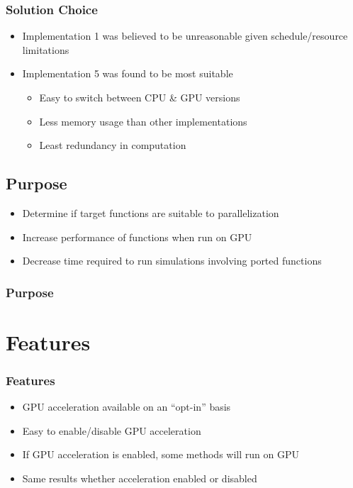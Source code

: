 \documentclass{beamer}
\begin{document}
\begin{frame}
\frametitle{Solution Choice}
\begin{itemize}
\item Implementation 1 was believed to be unreasonable given schedule/resource limitations
\item Implementation 5 was found to be most suitable
\begin{itemize}
\item Easy to switch between CPU & GPU versions
\item Less memory usage than other implementations
\item Least redundancy in computation
\end{itemize}
\end{itemize}
\end{frame}

\subsection{Purpose}
\begin{frame}
\begin{itemize}
\item Determine if target functions are suitable to parallelization 
\item Increase performance of functions when run on GPU
\item Decrease time required to run simulations involving ported functions
\end{itemize}
\frametitle{Purpose}
\end{frame}

\section{Features}
\begin{frame}
\frametitle{Features}
\begin{itemize}
\item GPU acceleration available on an ``opt-in'' basis
\item Easy to enable/disable GPU acceleration
\item If GPU acceleration is enabled, some methods will run on GPU
\item Same results whether acceleration enabled or disabled
\end{itemize}
\end{frame}
\end{document}
